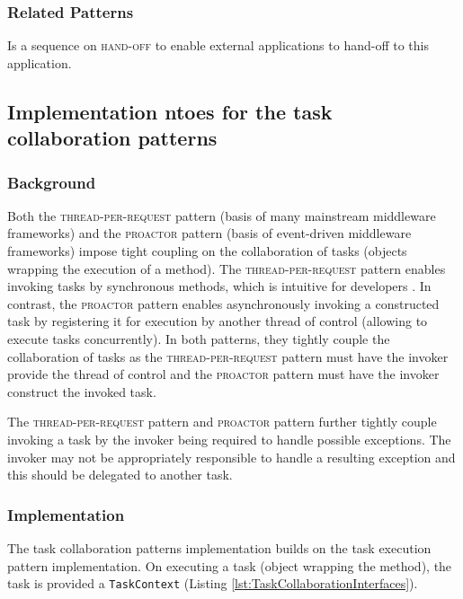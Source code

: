 \documentclass[prodmode]{style/acmlarge}
\begin{document}
\subsubsection*{Related Patterns} Is a sequence on \textsc{hand-off} to enable
external applications to hand-off to this application.



\subsection{Implementation ntoes for the task collaboration patterns}

\subsubsection*{Background}

Both the \textsc{thread-per-request} pattern \cite{thread-per-request} (basis of
many mainstream middleware frameworks) and the \textsc{proactor} pattern
\cite{proactor} (basis of event-driven middleware frameworks) impose tight
coupling on the collaboration of tasks (objects wrapping the execution of a
method).  The \textsc{thread-per-request} pattern enables invoking tasks by
synchronous methods, which is intuitive for developers \cite[p. 2]{proactor}.
In contrast, the \textsc{proactor} pattern enables asynchronously invoking a
constructed task by registering it for execution by another thread of control
(allowing to execute tasks concurrently).  In both patterns, they tightly couple
the collaboration of tasks as the \textsc{thread-per-request} pattern must have
the invoker provide the thread of control and the \textsc{proactor} pattern must
have the invoker construct the invoked task.

The \textsc{thread-per-request} pattern and \textsc{proactor} pattern further
tightly couple invoking a task by the invoker being required to handle
possible exceptions.  The invoker may not be appropriately responsible to handle
a resulting exception and this should be delegated to another task.


\subsubsection*{Implementation}

The task collaboration patterns implementation builds on the task execution
pattern implementation.  On executing a task (object wrapping the method), the
task is provided a \texttt{TaskContext} (Listing
\ref{lst:TaskCollaborationInterfaces}).
\end{document}
